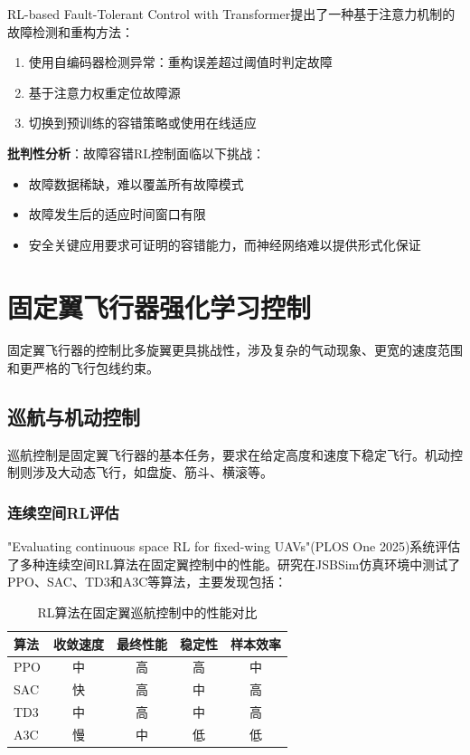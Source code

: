\documentclass[12pt,a4paper]{ctexart}
\begin{document}
RL-based Fault-Tolerant Control with Transformer提出了一种基于注意力机制的故障检测和重构方法：

\begin{enumerate}
    \item 使用自编码器检测异常：重构误差超过阈值时判定故障
    \item 基于注意力权重定位故障源
    \item 切换到预训练的容错策略或使用在线适应
\end{enumerate}

\textbf{批判性分析}：故障容错RL控制面临以下挑战：
\begin{itemize}
    \item 故障数据稀缺，难以覆盖所有故障模式
    \item 故障发生后的适应时间窗口有限
    \item 安全关键应用要求可证明的容错能力，而神经网络难以提供形式化保证
\end{itemize}

\section{固定翼飞行器强化学习控制}\label{sec:fixedwing}

固定翼飞行器的控制比多旋翼更具挑战性，涉及复杂的气动现象、更宽的速度范围和更严格的飞行包线约束。

\subsection{巡航与机动控制}

巡航控制是固定翼飞行器的基本任务，要求在给定高度和速度下稳定飞行。机动控制则涉及大动态飞行，如盘旋、筋斗、横滚等。

\subsubsection{连续空间RL评估}

"Evaluating continuous space RL for fixed-wing UAVs"(PLOS One 2025)系统评估了多种连续空间RL算法在固定翼控制中的性能。研究在JSBSim仿真环境中测试了PPO、SAC、TD3和A3C等算法，主要发现包括：

\begin{table}[htbp]
\centering
\caption{RL算法在固定翼巡航控制中的性能对比}
\label{tab:fixedwing_comparison}
\begin{tabular}{@{}lcccc@{}}
\toprule
\textbf{算法} & \textbf{收敛速度} & \textbf{最终性能} & \textbf{稳定性} & \textbf{样本效率} \\
\midrule
PPO & 中 & 高 & 高 & 中 \\
SAC & 快 & 高 & 中 & 高 \\
TD3 & 中 & 高 & 中 & 高 \\
A3C & 慢 & 中 & 低 & 低 \\
\bottomrule
\end{tabular}
\end{table}
\end{document}
